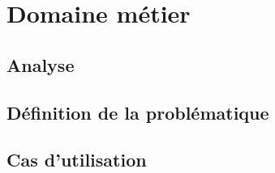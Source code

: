 
\chapter[Domaine métier]{Domaine métier}
\blindtext

\section[Analyse]{Analyse}
\blindtext

\section[Problématique]{Définition de la problématique}
\blindtext

\section[Use case]{Cas d'utilisation}
\blindtext
